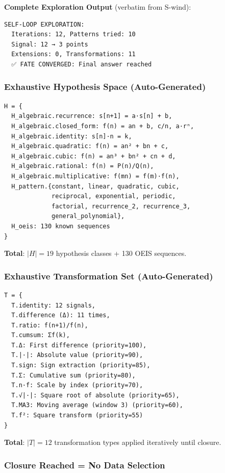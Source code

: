 \documentclass[twocolumn,showpacs,preprintnumbers,amsmath,amssymb,prl]{revtex4-2}
\begin{document}
\textbf{Complete Exploration Output} (verbatim from S-wind):

\begin{verbatim}
SELF-LOOP EXPLORATION:
  Iterations: 12, Patterns tried: 10
  Signal: 12 → 3 points
  Extensions: 0, Transformations: 11
  ✅ FATE CONVERGED: Final answer reached
\end{verbatim}

\subsubsection{Exhaustive Hypothesis Space (Auto-Generated)}

\begin{verbatim}
H = {
  H_algebraic.recurrence: s[n+1] = a·s[n] + b,
  H_algebraic.closed_form: f(n) = an + b, c/n, a·rⁿ,
  H_algebraic.identity: s[n]·n = k,
  H_algebraic.quadratic: f(n) = an² + bn + c,
  H_algebraic.cubic: f(n) = an³ + bn² + cn + d,
  H_algebraic.rational: f(n) = P(n)/Q(n),
  H_algebraic.multiplicative: f(mn) = f(m)·f(n),
  H_pattern.{constant, linear, quadratic, cubic,
             reciprocal, exponential, periodic,
             factorial, recurrence_2, recurrence_3,
             general_polynomial},
  H_oeis: 130 known sequences
}
\end{verbatim}

\textbf{Total}: $|H| = 19$ hypothesis classes + 130 OEIS sequences.

\subsubsection{Exhaustive Transformation Set (Auto-Generated)}

\begin{verbatim}
T = {
  T.identity: 12 signals,
  T.difference (Δ): 11 times,
  T.ratio: f(n+1)/f(n),
  T.cumsum: Σf(k),
  T.Δ: First difference (priority=100),
  T.|·|: Absolute value (priority=90),
  T.sign: Sign extraction (priority=85),
  T.Σ: Cumulative sum (priority=80),
  T.n·f: Scale by index (priority=70),
  T.√|·|: Square root of absolute (priority=65),
  T.MA3: Moving average (window 3) (priority=60),
  T.f²: Square transform (priority=55)
}
\end{verbatim}

\textbf{Total}: $|T| = 12$ transformation types applied iteratively until closure.

\subsubsection{Closure Reached = No Data Selection}
\end{document}
